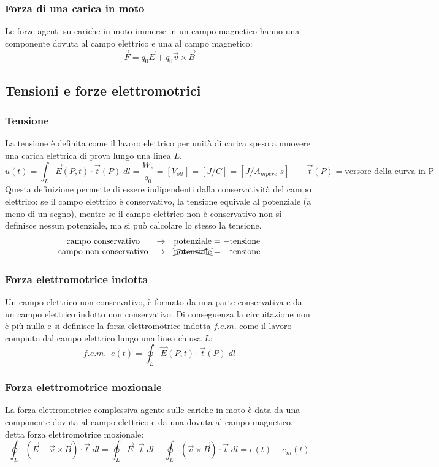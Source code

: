 \documentclass[a4paper]{article}
\begin{document}
\subsubsection*{Forza di una carica in moto}
Le forze agenti su cariche in moto immerse in un campo magnetico hanno una componente dovuta al campo elettrico e una al campo
magnetico: \[\vec{F} = q_0 \vec{E} + q_0 \vec{v} \times \vec{B}\]

\subsection{Tensioni e forze elettromotrici}
\subsubsection*{Tensione}
La tensione è definita come il lavoro elettrico per unità di carica speso a muovere una carica elettrica di prova lungo una linea \(L\).
\[u(t) = \int_L \vec{E}(P,t) \cdot \vec{t}(P) \; dl = \frac{W_e}{q_0} = [V_{olt}] = [J/C] = [J/A_{mpere} \;\! s] \qquad \vec{t}(P) = \text{versore della curva in P} \]
Questa definizione permette di essere indipendenti dalla conservatività del campo elettrico: se il campo elettrico è conservativo,
la tensione equivale al potenziale (a meno di un segno), mentre se il campo elettrico non è conservativo non si definisce nessun
potenziale, ma si può calcolare lo stesso la tensione.
\[\begin{matrix}
	\text{campo conservativo} & \rightarrow & \text{potenziale} = -\text{tensione} \\
	\text{campo non conservativo} & \rightarrow & \xcancel{\text{potenziale}} = -\text{tensione}
\end{matrix}\]

\subsubsection*{Forza elettromotrice indotta}
Un campo elettrico non conservativo, è formato da una parte conservativa e da un campo elettrico indotto non conservativo.
Di conseguenza la circuitazione non è più nulla e si definisce la forza elettromotrice indotta \(f.e.m.\) come il lavoro
compiuto dal campo elettrico lungo una linea chiusa \(L\):
\[f.e.m. \;\; e(t) = \oint_L \vec{E}(P,t) \cdot \vec{t}(P) \; dl\]

\subsubsection*{Forza elettromotrice mozionale}
La forza elettromotrice complessiva agente sulle cariche in moto è data da una componente dovuta al campo elettrico e da una
dovuta al campo magnetico, detta forza elettromotrice mozionale:
\[\oint_L (\vec{E} + \vec{v}\times \vec{B}) \cdot \vec{t} \; dl = \oint_L \vec{E} \cdot \vec{t} \; dl +  \oint_L (\vec{v} \times \vec{B}) \cdot \vec{t} \; dl = e(t) + e_m(t)\]
\end{document}
